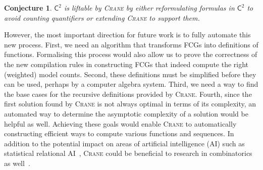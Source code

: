 \documentclass{article}
\newtheorem{conjecture}{Conjecture}
\theoremstyle{definition}
\newcommand{\Ctwo}{$\mathsf{C}^{2}$}
\begin{document}
\begin{conjecture}
  \Ctwo{} is liftable by \textsc{Crane} by either reformulating formulas in
  \Ctwo{} to avoid counting quantifiers or extending \textsc{Crane} to support
  them.
\end{conjecture}

However, the most important direction for future work is to fully automate this
new process. First, we need an algorithm that transforms FCGs into definitions
of functions. Formalising this process would also allow us to prove the
correctness of the new compilation rules in constructing FCGs that indeed
compute the right (weighted) model counts. Second, these definitions must be
simplified before they can be used, perhaps by a computer algebra system. Third,
we need a way to find the base cases for the recursive definitions provided by
\textsc{Crane}. Fourth, since the first solution found by \textsc{Crane} is not
always optimal in terms of its complexity, an automated way to determine the
asymptotic complexity of a solution would be helpful as well. Achieving these
goals would enable \textsc{Crane} to automatically constructing efficient ways
to compute various functions and sequences. In addition to the potential impact
on areas of artificial intelligence (AI) such as statistical relational
AI~\cite{DBLP:series/synthesis/2016Raedt}, \textsc{Crane} could be beneficial to
research in combinatorics as well~\cite{DBLP:conf/ilp/BarvinekB0ZK21}.



\end{document}
